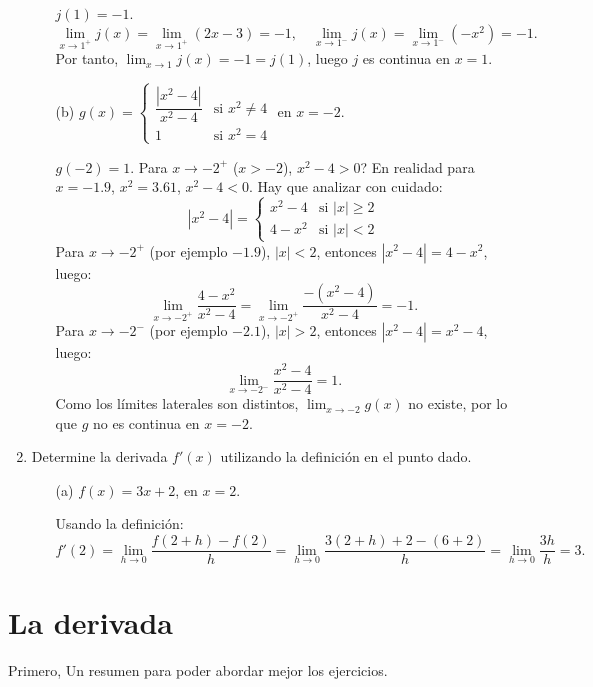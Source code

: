 \documentclass[12pt]{article}
\begin{document}
\begin{enumerate}[label=\arabic*.]
\begin{itemize}
        $j(1) = -1$. 
        \[
        \lim_{x\to1^+} j(x) = \lim_{x\to1^+} (2x-3) = -1, \quad \lim_{x\to1^-} j(x) = \lim_{x\to1^-} (-x^2) = -1.
        \]
        Por tanto, $\lim_{x\to1} j(x) = -1 = j(1)$, luego $j$ es continua en $x=1$.
        
        \item[(b)] $g(x) = \begin{cases}
            \dfrac{|x^2-4|}{x^2-4} & \text{si } x^2 \neq 4 \\
            1 & \text{si } x^2=4
        \end{cases}$ en $x=-2$.
        
        $g(-2)=1$. Para $x\to-2^+$ ($x>-2$), $x^2-4>0$? En realidad para $x=-1.9$, $x^2=3.61$, $x^2-4<0$. Hay que analizar con cuidado:
        \[
        |x^2-4| = \begin{cases}
            x^2-4 & \text{si } |x|\ge2 \\
            4-x^2 & \text{si } |x|<2
        \end{cases}
        \]
        Para $x\to-2^+$ (por ejemplo $-1.9$), $|x|<2$, entonces $|x^2-4| = 4-x^2$, luego:
        \[
        \lim_{x\to-2^+} \frac{4-x^2}{x^2-4} = \lim_{x\to-2^+} \frac{-(x^2-4)}{x^2-4} = -1.
        \]
        Para $x\to-2^-$ (por ejemplo $-2.1$), $|x|>2$, entonces $|x^2-4| = x^2-4$, luego:
        \[
        \lim_{x\to-2^-} \frac{x^2-4}{x^2-4} = 1.
        \]
        Como los límites laterales son distintos, $\lim_{x\to-2} g(x)$ no existe, por lo que $g$ no es continua en $x=-2$.
    \end{itemize}

    \item Determine la derivada $f'(x)$ utilizando la definición en el punto dado.
    \begin{itemize}
        \item[(a)] $f(x)=3x+2$, en $x=2$.
        
        Usando la definición:
        \[
        f'(2) = \lim_{h\to0} \frac{f(2+h)-f(2)}{h} = \lim_{h\to0} \frac{3(2+h)+2 - (6+2)}{h} = \lim_{h\to0} \frac{3h}{h} = 3.
        \]
    \end{itemize}
\end{enumerate}
 \newpage
\section{La derivada}
Primero, Un resumen para poder abordar mejor los ejercicios.
\end{document}
